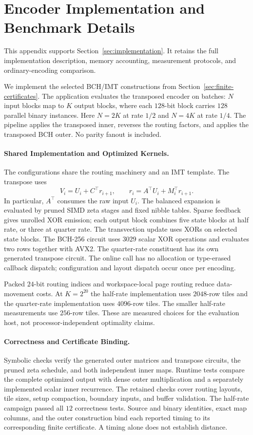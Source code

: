 \section{Encoder Implementation and Benchmark Details}
\label{app:implementation}

This appendix supports Section~\ref{sec:implementation}.
It retains the full implementation description, memory accounting,
measurement protocols, and ordinary-encoding comparison.


We implement the selected BCH/IMT constructions from
Section~\ref{sec:finite-certificates}. The application evaluates the
transposed encoder on batches: $N$ input blocks map to $K$ output blocks,
where each $128$-bit block carries $128$ parallel binary instances.
Here $N=2K$ at rate $1/2$ and $N=4K$ at rate $1/4$.
The pipeline applies the transposed inner, reverses the routing factors,
and applies the transposed BCH outer. No parity fanout is included.

\paragraph{Shared Implementation and Optimized Kernels.}
The configurations share the routing machinery and an IMT template.
The transpose uses
\[
 V_i=U_i+C^\top r_{i+1},\qquad r_i=A^\top U_i+M_i^\top r_{i+1}.
\]
In particular, $A^\top$ consumes the raw input $U_i$.
The balanced expansion is evaluated by pruned SIMD zeta stages and fixed
nibble tables. Sparse feedback gives unrolled XOR emission; each output
block combines five state blocks at half rate, or three at quarter rate.
The transvection update uses XORs on selected state blocks.
The BCH-256 circuit uses $3029$ scalar XOR operations and evaluates two
rows together with AVX2. The quarter-rate constituent has its own generated
transpose circuit. The online call has no allocation or type-erased
callback dispatch; configuration and layout dispatch occur once per encoding.

Packed $24$-bit routing indices and workspace-local page routing reduce
data-movement costs. At $K=2^{20}$ the half-rate implementation uses
$2048$-row tiles and the quarter-rate implementation uses $4096$-row tiles.
The smaller half-rate measurements use $256$-row tiles.
These are measured choices for the evaluation host, not
processor-independent optimality claims.

\paragraph{Correctness and Certificate Binding.}
Symbolic checks verify the generated outer matrices and transpose circuits,
the pruned zeta schedule, and both independent inner maps.
Runtime tests compare the complete optimized output with dense outer
multiplication and a separately implemented scalar inner recurrence.
The retained checks cover routing layouts, tile sizes, setup compaction,
boundary inputs, and buffer validation. The half-rate campaign passed all
$12$ correctness tests. Source and binary identities, exact map columns,
and the outer construction bind each reported timing to its corresponding
finite certificate. A timing alone does not establish distance.

